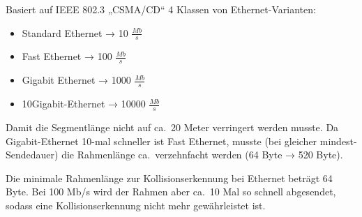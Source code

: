 Basiert auf IEEE 802.3 „CSMA/CD“
4 Klassen von Ethernet-Varianten:
\begin{itemize}
    \item Standard Ethernet → 10 $\frac{Mb}{s}$
    \item Fast Ethernet → 100 $\frac{Mb}{s}$
    \item Gigabit Ethernet → 1000 $\frac{Mb}{s}$
    \item 10Gigabit-Ethernet → 10000 $\frac{Mb}{s}$
\end{itemize}

Damit die Segmentlänge nicht auf ca.\ 20 Meter verringert werden musste.
Da Gigabit-Ethernet 10-mal schneller ist Fast Ethernet, musste (bei gleicher mindest-Sendedauer) die Rahmenlänge ca.\ verzehnfacht werden (64 Byte → 520 Byte).

Die minimale Rahmenlänge zur Kollisionserkennung bei Ethernet beträgt 64 Byte.
Bei 100 Mb/s wird der Rahmen aber ca.\ 10 Mal so schnell abgesendet, sodass eine Kollisionserkennung nicht mehr gewährleistet ist.

